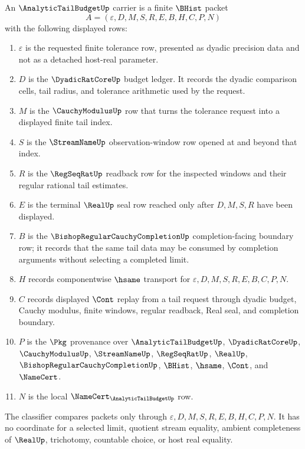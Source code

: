 \begin{definition}
\label{def:analytic-tail-budget-carrier}
An $\AnalyticTailBudgetUp$ carrier is a finite $\BHist$ packet
$$
A=(\varepsilon,D,M,S,R,E,B,H,C,P,N)
$$
with the following displayed rows:
\begin{enumerate}
\item $\varepsilon$ is the requested finite tolerance row, presented as dyadic precision data and not as a detached host-real parameter.
\item $D$ is the $\DyadicRatCoreUp$ budget ledger. It records the dyadic comparison cells, tail radius, and tolerance arithmetic used by the request.
\item $M$ is the $\CauchyModulusUp$ row that turns the tolerance request into a displayed finite tail index.
\item $S$ is the $\StreamNameUp$ observation-window row opened at and beyond that index.
\item $R$ is the $\RegSeqRatUp$ readback row for the inspected windows and their regular rational tail estimates.
\item $E$ is the terminal $\RealUp$ seal row reached only after $D,M,S,R$ have been displayed.
\item $B$ is the $\BishopRegularCauchyCompletionUp$ completion-facing boundary row; it records that the same tail data may be consumed by completion arguments without selecting a completed limit.
\item $H$ records componentwise $\hsame$ transport for $\varepsilon,D,M,S,R,E,B,C,P,N$.
\item $C$ records displayed $\Cont$ replay from a tail request through dyadic budget, Cauchy modulus, finite windows, regular readback, Real seal, and completion boundary.
\item $P$ is the $\Pkg$ provenance over $\AnalyticTailBudgetUp$, $\DyadicRatCoreUp$, $\CauchyModulusUp$, $\StreamNameUp$, $\RegSeqRatUp$, $\RealUp$, $\BishopRegularCauchyCompletionUp$, $\BHist$, $\hsame$, $\Cont$, and $\NameCert$.
\item $N$ is the local $\NameCert_{\AnalyticTailBudgetUp}$ row.
\end{enumerate}
The classifier compares packets only through $\varepsilon,D,M,S,R,E,B,H,C,P,N$. It has no coordinate for a selected limit, quotient stream equality, ambient completeness of $\RealUp$, trichotomy, countable choice, or host real equality.
\end{definition}

